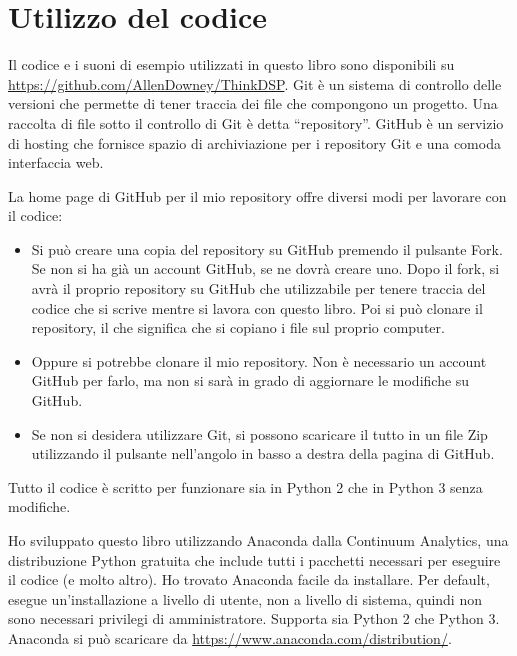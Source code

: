 \documentclass[12pt,a4paper]{book}
\begin{document}
\section{Utilizzo del codice} \label{code} 

Il codice e i suoni di esempio utilizzati in questo libro sono disponibili su \url{https://github.com/AllenDowney/ThinkDSP}. Git è un sistema di controllo delle versioni che permette di tener traccia dei file che compongono un progetto. Una raccolta di file sotto il controllo di Git è detta ``repository''. GitHub è un servizio di hosting che fornisce spazio di archiviazione per i repository Git e una comoda interfaccia web.    

La home page di GitHub per il mio repository offre diversi modi per lavorare con il codice:

\begin{itemize} 

\item Si può creare una copia del repository su GitHub premendo il pulsante {\sf Fork}. Se non si ha già un account GitHub, se ne dovrà creare uno. Dopo il fork, si avrà il proprio repository su GitHub che utilizzabile per tenere traccia del codice che si scrive mentre si lavora con questo libro. Poi si può clonare il repository, il che significa che si copiano i file sul proprio computer.  

\item Oppure si potrebbe clonare il mio repository. Non è necessario un account GitHub per farlo, ma non si sarà in grado di aggiornare le modifiche su GitHub.  

\item Se non si desidera utilizzare Git, si possono scaricare il tutto in un file Zip utilizzando il pulsante nell'angolo in basso a destra della pagina di GitHub.

\end{itemize} 

Tutto il codice è scritto per funzionare sia in Python 2 che in Python 3 senza modifiche.

Ho sviluppato questo libro utilizzando Anaconda dalla Continuum Analytics, una distribuzione Python gratuita che include tutti i pacchetti necessari per eseguire il codice (e molto altro). Ho trovato Anaconda facile da installare. Per default, esegue un'installazione a livello di utente, non a livello di sistema, quindi non sono necessari privilegi di amministratore. Supporta sia Python 2 che Python 3. Anaconda si può scaricare da \url{https://www.anaconda.com/distribution/}.  
\end{document}
